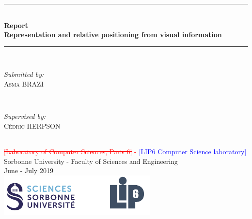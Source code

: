 \documentclass[12pt]{report}
\newcommand{\hcr}[2]{\textcolor{red}{\sout{[#1]} - \textcolor{blue}{ [#2]}}}
\begin{document}
	\begin{titlepage}
		
		\newcommand{\HRule}{\rule{\linewidth}{0.5mm}} %
		
		\center 
		\HRule \\[0.4cm]
		{ \huge \bfseries Report \\Representation and relative positioning from visual information}\\[0.4cm]
		\HRule \\[1.5cm]
		
		\begin{minipage}{0.4\textwidth}
			\begin{flushleft} \large
				\emph{Submitted by:}\\
				\textsc{Asma BRAZI}
			\end{flushleft}
		\end{minipage}
		~
		\begin{minipage}{0.4\textwidth}
			\begin{flushright} \large
				\emph{Supervised by:} \\
				\textsc{Cédric HERPSON}\\
			\end{flushright}
		\end{minipage}\\[4cm]
		
		
		{\large \hcr{Laboratory of Computer Sciences, Paris 6}{LIP6 Computer Science laboratory} \\ Sorbonne 
University - Faculty of Sciences and Engineering}\\[3cm] 
		{\large June - July 2019 }\\[3cm] 
		\includegraphics[width=0.6\textwidth]{res/logo.png}\\[1cm] 
		\vfill %
		
	\end{titlepage}
	
\end{document}

